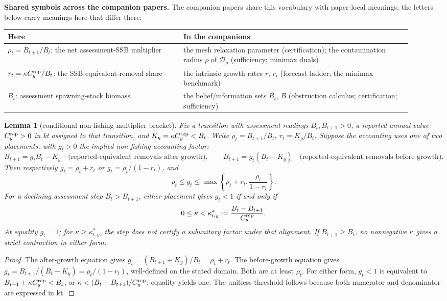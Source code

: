 \documentclass[10pt,twocolumn]{article}
\theoremstyle{plain}
\newtheorem{lemma}[theorem]{Lemma}
\theoremstyle{remark}
\begin{document}
\medskip
\noindent\textbf{Shared symbols across the companion papers.} The companion papers share this vocabulary with paper-local meanings; the letters below carry meanings here that differ there:
\begin{center}\small
\begin{tabular}{@{}p{0.40\linewidth}p{0.52\linewidth}@{}}
\toprule
\textbf{Here} & \textbf{In the companions} \\
\midrule
\(\rho_t=B_{t+1}/B_t\): the net assessment-SSB multiplier &
the mesh relaxation parameter (certification); the contamination radius
\(\rho\) of \(\mathcal{D}_{\rho}\) (sufficiency; minimax duals) \\
\(r_t=\kappa C_y^{\rm rep}/B_t\): the SSB-equivalent-removal share &
the intrinsic growth rates \(r\), \(r_i\) (forecast ladder; the
minimax benchmark) \\
\(B_t\): assessment spawning-stock biomass &
the belief/information sets \(B_t\), \(B\) (obstruction calculus;
certification; sufficiency) \\
\bottomrule
\end{tabular}
\end{center}

\begin{lemma}[conditional non-fishing multiplier bracket]\label{lem:bracket}
Fix a transition with assessment readings \(B_t,B_{t+1}>0\), a reported annual value \(C_y^{\rm rep}>0\) in kt assigned to that transition, and \(K_y=\kappa C_y^{\rm rep}<B_t\). Write \(\rho_t=B_{t+1}/B_t\), \(r_t=K_y/B_t\). Suppose the accounting uses one of two placements, with \(g_t>0\) the implied non-fishing accounting factor:
\[
B_{t+1}=g_t B_t-K_y \quad\text{(reported-equivalent removals after growth)},
\qquad
B_{t+1}=g_t(B_t-K_y) \quad\text{(reported-equivalent removals before growth)}.
\]
Then respectively \(g_t=\rho_t+r_t\) or \(g_t=\rho_t/(1-r_t)\), and
\[
\rho_t\le g_t\le\max\left\{\rho_t+r_t,\frac{\rho_t}{1-r_t}\right\}.
\]
For a declining assessment step \(B_t>B_{t+1}\), either placement gives \(g_t<1\) if and only if
\[
0\le\kappa<\kappa^*_{t,y}:=\frac{B_t-B_{t+1}}{C_y^{\rm rep}}.
\]
At equality \(g_t=1\); for \(\kappa\ge\kappa^*_{t,y}\), the step does not certify a subunitary factor under that alignment. If \(B_{t+1}\ge B_t\), no nonnegative \(\kappa\) gives a strict contraction in either form.
\end{lemma}

\begin{proof}
The after-growth equation gives \(g_t=(B_{t+1}+K_y)/B_t=\rho_t+r_t\). The before-growth equation gives \(g_t=B_{t+1}/(B_t-K_y)=\rho_t/(1-r_t)\), well-defined on the stated domain. Both are at least \(\rho_t\). For either form, \(g_t<1\) is equivalent to \(B_{t+1}+\kappa C_y^{\rm rep}<B_t\), or \(\kappa<(B_t-B_{t+1})/C_y^{\rm rep}\); equality yields one. The unitless threshold follows because both numerator and denominator are expressed in kt.
\end{proof}
\end{document}
